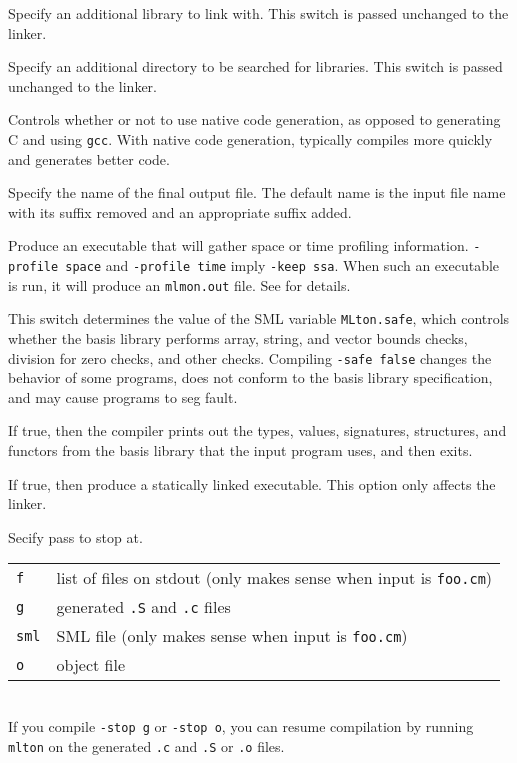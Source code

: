 \begin{description}
Specify an additional library to link with.
This switch is passed unchanged to the linker.

Specify an additional directory to be searched for libraries.
This switch is passed unchanged to the linker.

Controls whether or not to use native code generation, as opposed to
generating C and using {\tt gcc}.  With native code generation,
{\mlton} typically compiles more quickly and generates better code.

Specify the name of the final output file.
The default name is the input file name with its
suffix removed and an appropriate suffix added.

Produce an executable that will gather space or time profiling information.
{\tt -profile space} and {\tt -profile time} imply {\tt -keep ssa}.
When such an executable is run, it will produce an {\tt mlmon.out} file.
See  for details.

This switch determines the value of the SML variable {\tt MLton.safe}, which
controls whether the basis library performs array, string, and vector bounds
checks, division for zero checks, and other checks.  Compiling {\tt -safe false}
changes the behavior of some programs, does not conform to the basis library
specification, and may cause programs to seg fault.

If true, then the compiler prints out the types, values, signatures, structures,
and functors from the basis library that the input program uses, and then exits.

If true, then produce a statically linked executable.  This option only
affects the linker.

Secify pass to stop at.\\
\begin{tabular}{ll}
{\tt f} & list of files on stdout (only makes sense when input is {\tt foo.cm})\\
{\tt g} & generated {\tt .S} and {\tt .c} files\\
{\tt sml} & SML file (only makes sense when input is {\tt foo.cm})\\
{\tt o} & object file\\
\end{tabular}\\
If you compile {\tt -stop g} or {\tt -stop o}, you can resume compilation by
running {\tt mlton} on the generated {\tt .c} and {\tt .S} or {\tt .o} files.


\end{description}
